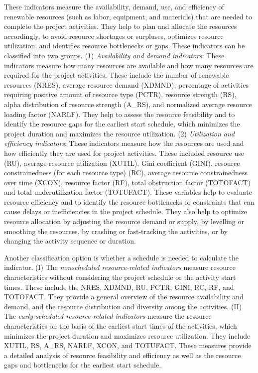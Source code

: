 \documentclass[preprint,
3p]{elsarticle} %
\begin{document}
These indicators measure the availability, demand, use, and efficiency
of renewable resources (such as labor, equipment, and materials) that
are needed to complete the project activities. They help to plan and
allocate the resources accordingly, to avoid resource shortages or
surpluses, optimizes resource utilization, and identifies resource
bottlenecks or gaps. These indicators can be classified into two groups.
(1) \emph{Availability and demand indicators}: These indicators measure
how many resources are available and how many resources are required for
the project activities. These include the number of renewable resources
(NRES), average resource demand (XDMND), percentage of activities
requiring positive amount of resource type (PCTR), resource strength
(RS), alpha distribution of resource strength (A\_RS), and normalized
average resource loading factor (NARLF). They help to assess the
resource feasibility and to identify the resource gaps for the earliest
start schedule, which minimizes the project duration and maximizes the
resource utilization. (2) \emph{Utilization and efficiency indicators}:
These indicators measure how the resources are used and how efficiently
they are used for project activities. These included resource use (RU),
average resource utilization (XUTIL), Gini coefficient (GINI), resource
constrainedness (for each resource type) (RC), average resource
constrainedness over time (XCON), resource factor (RF), total
obstruction factor (TOTOFACT) and total underutilization factor
(TOTUFACT). These variables help to evaluate resource efficiency and to
identify the resource bottlenecks or constraints that can cause delays
or inefficiencies in the project schedule. They also help to optimize
resource allocation by adjusting the resource demand or supply, by
levelling or smoothing the resources, by crashing or fast-tracking the
activities, or by changing the activity sequence or duration.

Another classification option is whether a schedule is needed to
calculate the indicator. (I) The \emph{nonscheduled resource-related
indicators} measure resource characteristics without considering the
project schedule or the activity start times. These include the NRES,
XDMND, RU, PCTR, GINI, RC, RF, and TOTOFACT. They provide a general
overview of the resource availability and demand, and the resource
distribution and diversity among the activities. (II) The
\emph{early-scheduled resource-related indicators} measure the resource
characteristics on the basis of the earliest start times of the
activities, which minimizes the project duration and maximizes resource
utilization. They include XUTIL, RS, A\_RS, NARLF, XCON, and TOTUFACT.
These measures provide a detailed analysis of resource feasibility and
efficiency as well as the resource gaps and bottlenecks for the earliest
start schedule.
\end{document}
